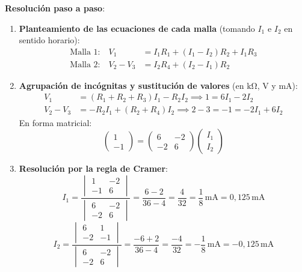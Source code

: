 \begin{ejemplo}
\textbf{Resolución paso a paso}:
\begin{enumerate}
    \item \textbf{Planteamiento de las ecuaciones de cada malla} (tomando $I_1$ e $I_2$ en sentido horario):
    \begin{align*}
        \text{Malla 1:} \quad V_1 &= I_1 R_1 + (I_1 - I_2) R_2 + I_1 R_3 \\
        \text{Malla 2:} \quad V_2 - V_3 &= I_2 R_4 + (I_2 - I_1) R_2
    \end{align*}
    \item \textbf{Agrupación de incógnitas y sustitución de valores} (en $\si{\kilo\ohm}$, $\si{\volt}$ y $\si{\milli\ampere}$):
    \begin{align*}
        V_1 &= (R_1 + R_2 + R_3) I_1 - R_2 I_2 \implies 1 = 6 I_1 - 2 I_2 \\
        V_2 - V_3 &= -R_2 I_1 + (R_2 + R_4) I_2 \implies 2 - 3 = -1 = -2 I_1 + 6 I_2
    \end{align*}
    En forma matricial:
    \begin{equation*}
        \begin{pmatrix} 1 \\ -1 \end{pmatrix} = \begin{pmatrix} 6 & -2 \\ -2 & 6 \end{pmatrix} \begin{pmatrix} I_1 \\ I_2 \end{pmatrix}
    \end{equation*}
    \item \textbf{Resolución por la regla de Cramer}:
    \begin{equation*}
        I_1 = \frac{\begin{vmatrix} 1 & -2 \\ -1 & 6 \end{vmatrix}}{\begin{vmatrix} 6 & -2 \\ -2 & 6 \end{vmatrix}} = \frac{6 - 2}{36 - 4} = \frac{4}{32} = \frac{1}{8}\,\si{\milli\ampere} = 0{,}125\,\si{\milli\ampere}
    \end{equation*}
    \begin{equation*}
        I_2 = \frac{\begin{vmatrix} 6 & 1 \\ -2 & -1 \end{vmatrix}}{\begin{vmatrix} 6 & -2 \\ -2 & 6 \end{vmatrix}} = \frac{-6 + 2}{36 - 4} = \frac{-4}{32} = -\frac{1}{8}\,\si{\milli\ampere} = -0{,}125\,\si{\milli\ampere}

\end{equation*}
\end{enumerate}
\end{ejemplo}
